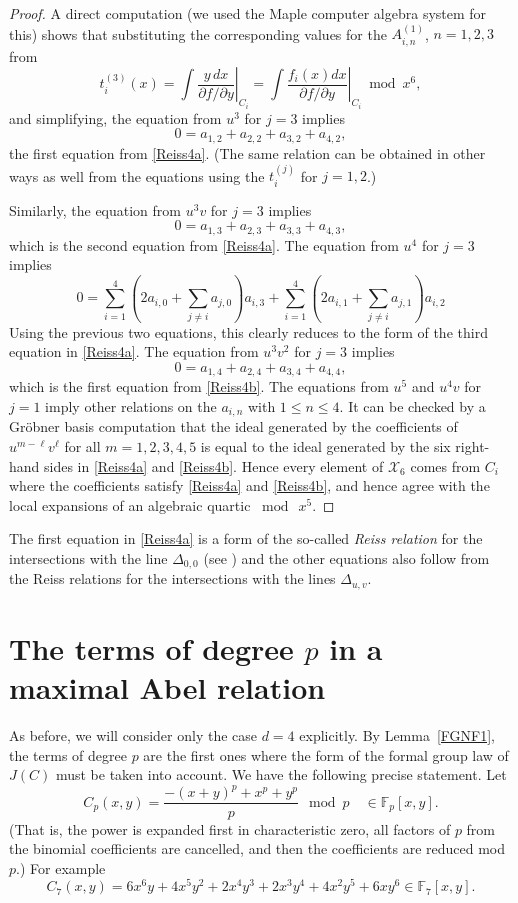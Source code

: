\documentclass[12pt]{amsart}
\theoremstyle{theorem}
\newcommand{\FF}{\mathbb{F}}
\begin{document}
\begin{proof}
A direct computation (we used the Maple computer algebra system for this) shows that substituting the corresponding values for the $A_{i,n}^{(1)}$, 
$n = 1, 2,3$ from 
$$t_i^{(3)}(x) =  \int \left. \frac{y\, dx}{\partial f/\partial y}\right|_{C_i} = \int \left. \frac{f_i(x) dx}{\partial f/\partial y}\right|_{C_i} \bmod x^6,$$
and simplifying, the equation from $u^3$ for $j = 3$ implies
$$0 = a_{1,2} + a_{2,2} + a_{3,2} + a_{4,2},$$
the first equation from \eqref{Reiss4a}.  (The same relation can be obtained in other ways as well from the equations using the $t_i^{(j)}$ for $j = 1,2$.)  

Similarly, the equation from $u^3 v$ for $j=3$ implies
$$0 = a_{1,3} + a_{2,3} + a_{3,3} + a_{4,3},$$
which is the second equation from \eqref{Reiss4a}.
The equation from $u^4$ for $j = 3$ implies
$$0 = \sum_{i=1}^4 (2 a_{i,0} + \sum_{j \ne i} a_{j,0}) a_{i,3} + \sum_{i=1}^4 (2 a_{i,1} + \sum_{j \ne i} a_{j,1}) a_{i,2}$$
Using the previous two equations, this clearly reduces to the form of the third equation in \eqref{Reiss4a}.  
The equation from $u^3 v^2$ for $j = 3$ implies
$$0 = a_{1,4} + a_{2,4} + a_{3,4} + a_{4,4},$$
which is the first equation from \eqref{Reiss4b}.   The equations from $u^5$ and $u^4 v$ for $j = 1$ imply other
relations on the $a_{i,n}$ with $1 \le n \le 4$.  It can be checked by a Gr\"obner basis computation that the ideal generated by the coefficients of $u^{m - \ell} v^\ell$
for all $m = 1,2,3,4,5$ is equal to the ideal generated by the six right-hand sides in \eqref{Reiss4a} and \eqref{Reiss4b}.  Hence every element of 
$\mathcal{X}_6$ comes from $C_i$ where the coefficients satisfy \eqref{Reiss4a} and \eqref{Reiss4b}, and hence agree with the local expansions
of an algebraic quartic $\bmod\ x^5$.  
\end{proof}

The first equation in \eqref{Reiss4a} is a form of the so-called \emph{Reiss relation} for the intersections with the line $\Delta_{0,0}$ (see \cite[p. 677]{GH}) and 
the other equations also follow from the Reiss relations for the intersections with the lines $\Delta_{u,v}$.  

\section{The terms of degree $p$ in a maximal Abel relation}

As before, 
we will consider only the case $d = 4$ explicitly.
By Lemma~\ref{FGNF1},
the terms of degree $p$ are the first ones where the form of the formal group law of $J(C)$ must be taken into account.  We have the following
precise statement.  Let 
$$C_p(x,y) = \frac{-(x+y)^p + x^p + y^p}{p} \mod p \quad  \in \FF_p[x,y].$$
(That is, the power is expanded first in characteristic zero, all factors of $p$ from the binomial coefficients are cancelled, and then the coefficients 
are reduced mod $p$.)  For example
$$C_7(x,y) = 6 x^6 y +  4 x^5 y^2 + 2 x^4 y^3 + 2 x^3 y^4 + 4 x^2 y^5 + 6 x y^6 \in \FF_7[x,y].$$
\end{document}
